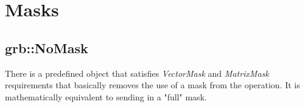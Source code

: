 \section{Masks}
\label{Sec:Masks}



\subsection{\sf grb::NoMask}

There is a predefined object that satisfies \textit{VectorMask} and \textit{MatrixMask}
requirements that basically removes the use of a mask from the operation. It
is mathematically equivalent to sending in a "full" mask.
